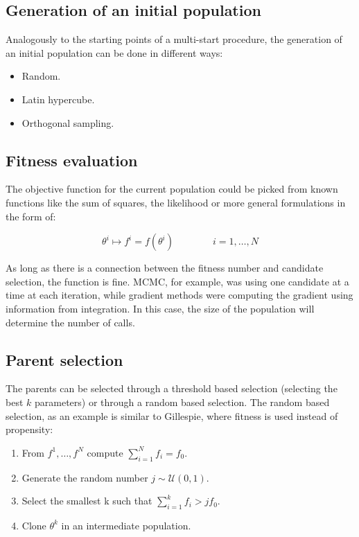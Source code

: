   \subsection{Generation of an initial population}
  Analogously to the starting points of a multi-start procedure, the generation of an initial population can be done in different ways:

  \begin{multicols}{2}
    \begin{itemize}
      \item Random.
      \item Latin hypercube.
      \item Orthogonal sampling.
    \end{itemize}
  \end{multicols}

  \subsection{Fitness evaluation}
  The objective function for the current population could be picked from known functions like the sum of squares, the likelihood or more general formulations in the form of:

  $$\theta^i \mapsto f^i = f(\theta^i)\qquad\qquad i = 1, \dots, N$$

  As long as there is a connection between the fitness number and candidate selection, the function is fine.
  MCMC, for example, was using one candidate at a time at each iteration, while gradient methods were computing the gradient using information from integration.
  In this case, the size of the population will determine the number of calls.

  \subsection{Parent selection}
  The parents can be selected through a threshold based selection (selecting the best $k$ parameters) or through a random based selection.
  The random based selection, as an example is similar to Gillespie, where fitness is used instead of propensity:

  \begin{multicols}{2}
        \begin{enumerate}
          \item From \(f^1,\dots,f^N\) compute \(\sum^N_{i=1}f_i=f_0\).
          \item Generate the random number \(j \sim \mathcal{U}(0,1)\).
          \item Select the smallest k such that \(\sum^k_{i=1}f_i>jf_0\).
          \item Clone \(\theta^k\) in an intermediate population.
        \end{enumerate}
  \end{multicols}


